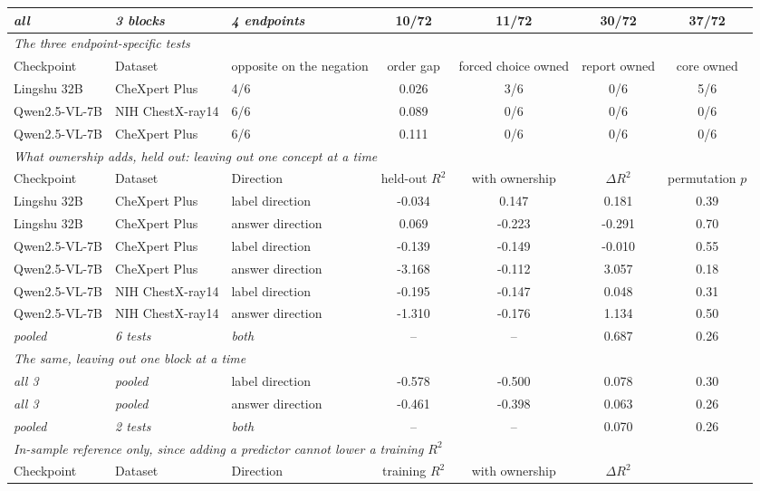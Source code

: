 \documentclass{article}
\begin{document}
\begin{table}[htbp]
{{{\begin{tabular}{lllcccc}
\midrule
\textit{all} & \textit{3 blocks} & \textit{4 endpoints} & 10/72 & 11/72 & 30/72 & 37/72 \\
\midrule
\multicolumn{7}{l}{\textit{The three endpoint-specific tests}} \\
Checkpoint & Dataset & opposite on the negation & order gap & forced choice owned & report owned & core owned \\
\midrule
Lingshu 32B & CheXpert Plus & 4/6 & 0.026 & 3/6 & 0/6 & 5/6 \\
Qwen2.5-VL-7B & NIH ChestX-ray14 & 6/6 & 0.089 & 0/6 & 0/6 & 0/6 \\
Qwen2.5-VL-7B & CheXpert Plus & 6/6 & 0.111 & 0/6 & 0/6 & 0/6 \\
\midrule
\multicolumn{7}{l}{\textit{What ownership adds, held out: leaving out one concept at a time}} \\
Checkpoint & Dataset & Direction & held-out $R^2$ & with ownership & $\Delta R^2$ & permutation $p$ \\
\midrule
Lingshu 32B & CheXpert Plus & label direction & -0.034 & 0.147 & 0.181 & 0.39 \\
Lingshu 32B & CheXpert Plus & answer direction & 0.069 & -0.223 & -0.291 & 0.70 \\
Qwen2.5-VL-7B & CheXpert Plus & label direction & -0.139 & -0.149 & -0.010 & 0.55 \\
Qwen2.5-VL-7B & CheXpert Plus & answer direction & -3.168 & -0.112 & 3.057 & 0.18 \\
Qwen2.5-VL-7B & NIH ChestX-ray14 & label direction & -0.195 & -0.147 & 0.048 & 0.31 \\
Qwen2.5-VL-7B & NIH ChestX-ray14 & answer direction & -1.310 & -0.176 & 1.134 & 0.50 \\
\textit{pooled} & \textit{6 tests} & \textit{both} & -- & -- & 0.687 & 0.26 \\
\midrule
\multicolumn{7}{l}{\textit{The same, leaving out one block at a time}} \\
\midrule
\textit{all 3} & \textit{pooled} & label direction & -0.578 & -0.500 & 0.078 & 0.30 \\
\textit{all 3} & \textit{pooled} & answer direction & -0.461 & -0.398 & 0.063 & 0.26 \\
\textit{pooled} & \textit{2 tests} & \textit{both} & -- & -- & 0.070 & 0.26 \\
\midrule
\multicolumn{7}{l}{\textit{In-sample reference only, since adding a predictor cannot lower a training $R^2$}} \\
Checkpoint & Dataset & Direction & training $R^2$ & with ownership & $\Delta R^2$ & \\

\end{tabular}}}}
\end{table}
\end{document}
